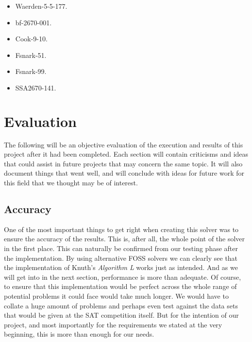 \documentclass{article}
\begin{document}
\begin{itemize}
    \item Waerden-5-5-177.
    \item bf-2670-001.
    \item Cook-9-10.
    \item Fsnark-51.
    \item Fsnark-99.
    \item SSA2670-141.
\end{itemize}


\section{Evaluation}
The following will be an objective evaluation of the execution and results of this project after it had been completed. Each
section will contain criticisms and ideas that could assist in future projects that may concern the same topic. It will also
document things that went well, and will conclude with ideas for future work for this field that we thought may be of interest.
\subsection{Accuracy}
One of the most important things to get right when creating this solver was to ensure the accuracy of the results. This is, after
all, the whole point of the solver in the first place. This can naturally be confirmed from our testing phase after the
implementation. By using alternative FOSS solvers we can clearly see that the implementation of Knuth's \textit{Algorithm L} works
just as intended. And as we will get into in the next section, performance is more than adequate. Of course, to ensure that this
implementation would be perfect across the whole range of potential problems it could face would take much longer. We would have
to collate a huge amount of problems and perhaps even test against the data sets that would be given at the SAT competition
itself. But for the intention of our project, and most importantly for the requirements we stated at the very beginning, this is
more than enough for our needs.
\end{document}
